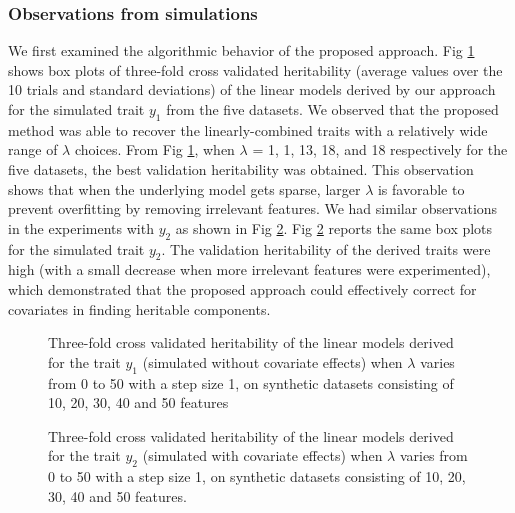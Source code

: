 \documentclass[10pt,letterpaper]{article}
\begin{document}
\subsubsection*{Observations from simulations}
We first examined the algorithmic behavior of the proposed approach. Fig \ref{fig:simu_cv_sex_only} shows box plots of three-fold cross validated heritability (average values over the 10 trials and standard deviations) of the linear models derived by our approach for the simulated trait $y_1$ from the five datasets. We observed that the proposed method was able to recover the linearly-combined traits with a relatively wide range of $\lambda$ choices. From Fig \ref{fig:simu_cv_sex_only}, when $\lambda$ = 1, 1, 13, 18, and 18 respectively for the five datasets, the best validation heritability was obtained. This observation shows that when the underlying model gets sparse, larger $\lambda$ is favorable to prevent overfitting by removing irrelevant features. We had similar observations in the experiments with $y_2$ as shown in Fig \ref{fig:simu_cv_all_cov}. Fig \ref{fig:simu_cv_all_cov} reports the same box plots for the simulated trait $y_2$.  The validation heritability of the derived traits were high (with a small decrease when more irrelevant features were experimented), which demonstrated that the proposed approach could effectively correct for covariates in finding heritable components. 
\begin{figure}[h!]
\vskip 0.2in
\begin{center}
\caption{Three-fold cross validated heritability of the linear models derived for the trait $y_1$ (simulated without covariate effects) when $\lambda$ varies from 0 to 50 with a step size 1, on synthetic datasets consisting of 10, 20, 30, 40 and 50 features }
\label{fig:simu_cv_sex_only}
\end{center}
\vskip -0.2in
\end{figure}
\begin{figure}[h!]
\vskip 0.2in
\begin{center}
\caption{Three-fold cross validated heritability of the linear models derived for the trait $y_2$ (simulated with covariate effects) when $\lambda$ varies from 0 to 50 with a step size 1, on synthetic datasets consisting of 10, 20, 30, 40 and 50 features.}
\label{fig:simu_cv_all_cov}
\end{center}
\vskip -0.2in
\end{figure}
\end{document}

